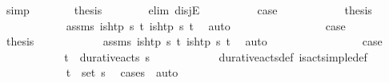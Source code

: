 \begin{isabellebody}
\ simp\isanewline
\ \ \ \ \isamarkupfalse%
\ \isamarkupfalse%
\ {\isacharquery}{\kern0pt}thesis\isanewline
\ \ \ \ \ \ \isamarkupfalse%
\ {\isacharparenleft}{\kern0pt}elim\ disjE{\isacharparenright}{\kern0pt}\isanewline
\ \ \ \ \ \ \ \ \isamarkupfalse%
\ {\isacharquery}{\kern0pt}case{}\isanewline
\ \ \ \ \ \ \ \ \isamarkupfalse%
\ \isamarkupfalse%
\ {\isacharquery}{\kern0pt}thesis\isanewline
\ \ \ \ \ \ \ \ \ \ \isamarkupfalse%
\ assms\ {\isacartoucheopen}{\isasymnot}is{\isacharunderscore}{\kern0pt}htp\ {\isasympi}s\ t{\isacartoucheclose}\ {\isacartoucheopen}is{\isacharunderscore}{\kern0pt}htp\ {\isasympi}s\ t\isactrlsub {\isasympi}{\isacartoucheclose}\ \isamarkupfalse%
\ auto\isanewline
\ \ \ \ \ \ \isamarkupfalse%
\isanewline
\ \ \ \ \ \ \ \ \isamarkupfalse%
\ {\isacharquery}{\kern0pt}case{}\isanewline
\ \ \ \ \ \ \ \ \isamarkupfalse%
\ \isamarkupfalse%
\ {\isacharquery}{\kern0pt}thesis\isanewline
\ \ \ \ \ \ \ \ \ \ \isamarkupfalse%
\ assms\ {\isacartoucheopen}{\isasymnot}is{\isacharunderscore}{\kern0pt}htp\ {\isasympi}s\ t{\isacartoucheclose}\ {\isacartoucheopen}is{\isacharunderscore}{\kern0pt}htp\ {\isasympi}s\ t\isactrlsub {\isasympi}{\isacartoucheclose}\ \isamarkupfalse%
\ auto\isanewline
\ \ \ \ \ \ \isamarkupfalse%
\isanewline
\ \ \ \ \ \ \ \ \isamarkupfalse%
\ {\isacharquery}{\kern0pt}case{}\isanewline
\ \ \ \ \ \ \ \ \isamarkupfalse%
\ \isamarkupfalse%
\ {\isachardoublequoteopen}{\isacharparenleft}{\kern0pt}t\isactrlsub {\isasympi}{\isacharcomma}{\kern0pt}{\isasympi}{\isacharparenright}{\kern0pt}\ {\isasymin}\ durative{\isacharunderscore}{\kern0pt}acts\ {\isasympi}s{\isachardoublequoteclose}\isanewline
\ \ \ \ \ \ \ \ \ \ \isamarkupfalse%
\ durative{\isacharunderscore}{\kern0pt}acts{\isacharunderscore}{\kern0pt}def\ is{\isacharunderscore}{\kern0pt}act{\isacharunderscore}{\kern0pt}simple{\isacharunderscore}{\kern0pt}def\isanewline
\ \ \ \ \ \ \ \ \ \ \isamarkupfalse%
\ {\isacartoucheopen}{\isacharparenleft}{\kern0pt}t\isactrlsub {\isasympi}{\isacharcomma}{\kern0pt}{\isasympi}{\isacharparenright}{\kern0pt}\ {\isasymin}\ set\ {\isasympi}s{\isacartoucheclose}\ \isamarkupfalse%
\ {\isacharparenleft}{\kern0pt}cases\ {\isasympi}{\isacharparenright}{\kern0pt}\ auto\isanewline

\end{isabellebody}
